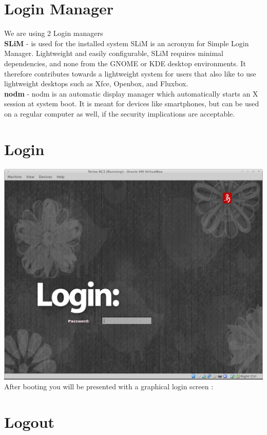\documentclass[12pt,a4paper]{book}
\begin{document}
 
\newpage

\chapter{Login Manager}
We are using 2 Login managers\\
	
\textbf{SLiM} \cite{SliM}- is used for the installed system
SLiM is an acronym for Simple Login Manager. Lightweight and easily configurable, SLiM requires minimal dependencies, and none from the GNOME or KDE desktop environments. It therefore contributes towards a lightweight system for users that also like to use lightweight desktops such as Xfce, Openbox, and Fluxbox. \\

\textbf{nodm} \cite{nodm} - nodm is an automatic display manager which automatically starts an X session at system boot. It is meant for devices like smartphones, but can be used on a regular computer as well, if the security implications are acceptable.


\chapter{Login}

\includegraphics[width=0.8\linewidth]{screen-shots/torios-rc2-login-screen} \\

After booting you will be presented with a graphical login screen :

\chapter{Logout}
\end{document}
